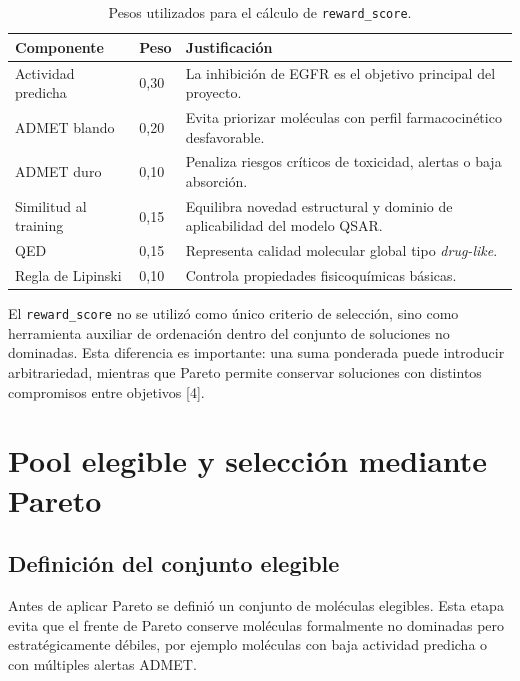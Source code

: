 \documentclass[IB]{TFUOC}%
\begin{document}
\begin{table}[H]
    \centering
    \small
    \begin{tabular}{p{5cm} p{2cm} p{6cm}}
        \hline
        \textbf{Componente} & \textbf{Peso} & \textbf{Justificación} \\
        \hline
        Actividad predicha & 0,30 & La inhibición de EGFR es el objetivo principal del proyecto. \\
        \hline
        ADMET blando & 0,20 & Evita priorizar moléculas con perfil farmacocinético desfavorable. \\
        \hline
        ADMET duro & 0,10 & Penaliza riesgos críticos de toxicidad, alertas o baja absorción. \\
        \hline
        Similitud al training & 0,15 & Equilibra novedad estructural y dominio de aplicabilidad del modelo QSAR. \\
        \hline
        QED & 0,15 & Representa calidad molecular global tipo \textit{drug-like}. \\
        \hline
        Regla de Lipinski & 0,10 & Controla propiedades fisicoquímicas básicas. \\
        \hline
    \end{tabular}
    \caption{Pesos utilizados para el cálculo de \texttt{reward\_score}.}
    \label{tab:pesos_reward}
\end{table}

El \texttt{reward\_score} no se utilizó como único criterio de selección, sino como herramienta auxiliar de ordenación dentro del conjunto de soluciones no dominadas. Esta diferencia es importante: una suma ponderada puede introducir arbitrariedad, mientras que Pareto permite conservar soluciones con distintos compromisos entre objetivos [4].

\section{Pool elegible y selección mediante Pareto}

\subsection{Definición del conjunto elegible}

Antes de aplicar Pareto se definió un conjunto de moléculas elegibles. Esta etapa evita que el frente de Pareto conserve moléculas formalmente no dominadas pero estratégicamente débiles, por ejemplo moléculas con baja actividad predicha o con múltiples alertas ADMET.
\end{document}

